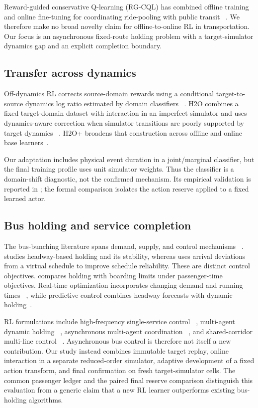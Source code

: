Reward-guided conservative Q-learning (RG-CQL) has combined offline training
and online fine-tuning for coordinating ride-pooling with public transit
~\citep{hu2025rgcql}. We therefore make no broad novelty claim for
offline-to-online RL in transportation. Our focus is an asynchronous fixed-route
holding problem with a target-simulator dynamics gap and an explicit completion
boundary.

\subsection{Transfer across dynamics}

Off-dynamics RL corrects source-domain rewards using a conditional
target-to-source dynamics log ratio estimated by domain classifiers
~\citep{eysenbach2021off}. H2O combines a fixed target-domain
dataset with interaction in an imperfect simulator and uses dynamics-aware
correction when simulator transitions are poorly supported by target dynamics
~\citep{niu2022h2o}. H2O+ broadens that construction across offline and online
base learners~\citep{niu2025h2oplus}.

Our adaptation includes physical event duration in a joint/marginal classifier,
but the final training profile uses unit simulator weights. Thus the classifier
is a domain-shift diagnostic, not the confirmed mechanism. Its empirical
validation is reported in ; the formal comparison
isolates the action reserve applied to a fixed learned actor.

\subsection{Bus holding and service completion}

The bus-bunching literature spans demand, supply, and control mechanisms
~\citep{rezazada2024review}. \citet{daganzo2009headway} studies headway-based
holding and its stability, whereas \citet{xuan2011dynamic} uses arrival
deviations from a virtual schedule to improve schedule reliability. These are
distinct control objectives. \citet{delgado2012holding} compares holding with
boarding limits under passenger-time objectives. Real-time optimization
incorporates changing demand and running times
~\citep{sanchezmartinez2016realtime}, while predictive control combines
headway forecasts with dynamic holding~\citep{andres2017predictive}.

RL formulations include high-frequency single-service control
~\citep{alesiani2018reinforcement}, multi-agent dynamic holding
~\citep{wang2020real}, asynchronous multi-agent coordination
~\citep{wang2021asynchronous}, and shared-corridor multi-line control
~\citep{wang2023multiobjective}. Asynchronous bus control is therefore not
itself a new contribution. Our study instead combines immutable
target replay, online interaction in a separate reduced-order simulator,
adaptive development of a fixed action transform, and final confirmation on
fresh target-simulator cells. The common passenger ledger and the paired final
reserve comparison distinguish this evaluation from a generic claim that a
new RL learner outperforms existing bus-holding algorithms.

